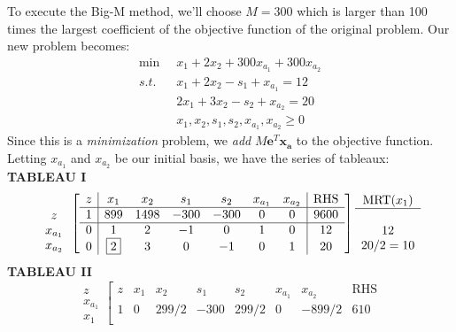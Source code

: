 \begin{example}
To execute the Big-M method, we'll choose $M = 300$ which is larger than 100 times the largest coefficient of the objective function of the original problem. Our new problem becomes:
\begin{equation}
\begin{aligned}
\min\;\; & 	x_1 + 2x_2 + 300x_{a_1} + 300x_{a_2}\\
s.t.\;\; &	x_1 + 2x_2 - s_1  + x_{a_1} = 12\\
		 &	2x_1 + 3x_2 - s_2  + x_{a_2}= 20\\
		 &	x_1, x_2, s_1, s_2,x_{a_1},x_{a_2} \geq 0
\end{aligned}
\end{equation}
Since this is a \textit{minimization} problem, we \textit{add} $M\mathbf{e}^T\mathbf{x_a}$ to the objective function. Letting $x_{a_1}$ and $x_{a_2}$ be our initial basis, we have the series of tableaux:\\
\noindent\textbf{TABLEAU I}
\begin{displaymath}
\begin{array}{c}
\\
z\\
x_{a_1}\\
x_{a_2}
\end{array}
\left[
\begin{array}{c|cccccc|c}
z & x_1 & x_2 & s_1 & s_2 & x_{a_1} & x_{a_2} & \text{RHS}\\
\hline
1 & 899 & 1498 & -300 & -300 & 0 & 0 & 9600\\
\hline
0 & 1 & 2 & -1 & 0  & 1 & 0 & 12\\
0 & \fbox{2} & 3 & 0  & -1 & 0 & 1 & 20
\end{array}
\right]
\begin{array}{c}
\text{MRT}(x_1)\\
\hline
\\
12\\
20/2 = 10
\end{array}
\end{displaymath}
\noindent\textbf{TABLEAU II}
\begin{displaymath}
\begin{array}{c}
\\
z\\
x_{a_1}\\
x_{1}
\end{array}
\left[
\begin{array}{c|cccccc|c}
z & x_1 & x_2 & s_1 & s_2 & x_{a_1} & x_{a_2} & \text{RHS}\\
\hline
1 & 0 & 299/2 & -300 & 299/2 & 0 & -899/2 & 610\\

\end{array}
\end{displaymath}
\end{example}
